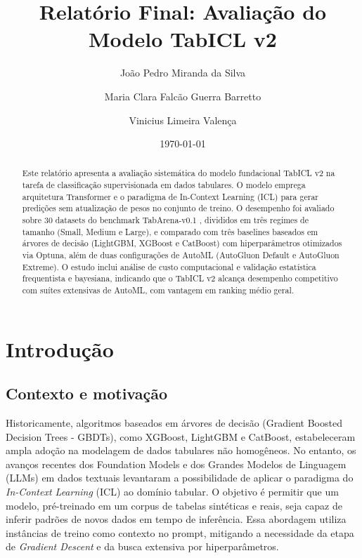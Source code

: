 \documentclass[12pt,a4paper]{article}
\title{Relatório Final: Avaliação do Modelo TabICL v2}
\author{João Pedro Miranda da Silva \and Maria Clara Falcão Guerra Barretto \and Vinicius Limeira Valença}
\date{\today}
\begin{document}
\maketitle

\begin{abstract}
Este relatório apresenta a avaliação sistemática do modelo fundacional TabICL v2 \cite{schlegel2026tabicl, tabicl_github} na tarefa de classificação supervisionada em dados tabulares. O modelo emprega arquitetura Transformer e o paradigma de In-Context Learning (ICL) para gerar predições sem atualização de pesos no conjunto de treino. O desempenho foi avaliado sobre 30 datasets do benchmark TabArena-v0.1 \cite{tabarena2025}, divididos em três regimes de tamanho (Small, Medium e Large), e comparado com três baselines baseados em árvores de decisão (LightGBM, XGBoost e CatBoost) com hiperparâmetros otimizados via Optuna, além de duas configurações de AutoML (AutoGluon Default e AutoGluon Extreme). O estudo inclui análise de custo computacional e validação estatística frequentista e bayesiana, indicando que o TabICL v2 alcança desempenho competitivo com suítes extensivas de AutoML, com vantagem em ranking médio geral.
\end{abstract}

\newpage
\tableofcontents

\newpage
\hypersetup{pageanchor=true}
\setcounter{page}{1}
\onehalfspacing

\section{Introdução}

\subsection{Contexto e motivação}
Historicamente, algoritmos baseados em árvores de decisão (Gradient Boosted Decision Trees - GBDTs), como XGBoost, LightGBM e CatBoost, estabeleceram ampla adoção na modelagem de dados tabulares não homogêneos. No entanto, os avanços recentes dos Foundation Models e dos Grandes Modelos de Linguagem (LLMs) em dados textuais levantaram a possibilidade de aplicar o paradigma do \textit{In-Context Learning} (ICL) ao domínio tabular. O objetivo é permitir que um modelo, pré-treinado em um corpus de tabelas sintéticas e reais, seja capaz de inferir padrões de novos dados em tempo de inferência. Essa abordagem utiliza instâncias de treino como contexto no prompt, mitigando a necessidade da etapa de \textit{Gradient Descent} e da busca extensiva por hiperparâmetros.
\end{document}
